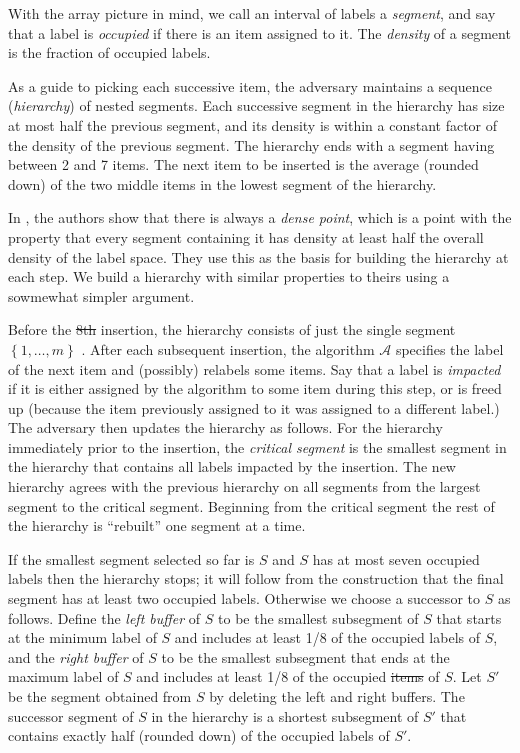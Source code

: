 \documentclass[unicode,review]{siamart1116}
\newcommand{\A}{\mathcal{A}}
\newcommand{\natInt}[2]{ \left\{ #1, \dotsc, #2 \right\} }
\numberwithin{theorem}{section}
\providecommand{\DIFadd}[1]{{\protect\color{blue}\uwave{#1}}} %
\providecommand{\DIFdel}[1]{{\protect\color{red}\sout{#1}}}                      %
\providecommand{\DIFaddbegin}{} %
\providecommand{\DIFaddend}{} %
\providecommand{\DIFdelbegin}{} %
\providecommand{\DIFdelend}{} %
\newcommand{\DIFscaledelfig}{0.5}
\newlength{\DIFdelgraphicswidth} %
\newlength{\DIFdelgraphicsheight} %
\newcommand{\DIFaddincludegraphics}[2][]{{\color{blue}\fbox{\DIFOincludegraphics[#1]{#2}}}} %
\newcommand{\DIFdelincludegraphics}[2][]{%
\sbox{\DIFdelgraphicsbox}{\DIFOincludegraphics[#1]{#2}}%
\settoboxwidth{\DIFdelgraphicswidth}{\DIFdelgraphicsbox} %
\settoboxtotalheight{\DIFdelgraphicsheight}{\DIFdelgraphicsbox} %
\scalebox{\DIFscaledelfig}{%
\parbox[b]{\DIFdelgraphicswidth}{\usebox{\DIFdelgraphicsbox}\\[-\baselineskip] \rule{\DIFdelgraphicswidth}{0em}}\llap{\resizebox{\DIFdelgraphicswidth}{\DIFdelgraphicsheight}{%
\setlength{\unitlength}{\DIFdelgraphicswidth}%
\begin{picture}(1,1)%
\thicklines\linethickness{2pt} %
{\color[rgb]{1,0,0}\put(0,0){\framebox(1,1){}}}%
{\color[rgb]{1,0,0}\put(0,0){\line( 1,1){1}}}%
{\color[rgb]{1,0,0}\put(0,1){\line(1,-1){1}}}%
\end{picture}%
}\hspace*{3pt}}} %
} %
\DeclareRobustCommand{\DIFaddbegin}{\DIFOaddbegin \let\includegraphics\DIFaddincludegraphics} %
\DeclareRobustCommand{\DIFaddend}{\DIFOaddend \let\includegraphics\DIFOincludegraphics} %
\DeclareRobustCommand{\DIFdelbegin}{\DIFOdelbegin \let\includegraphics\DIFdelincludegraphics} %
\DeclareRobustCommand{\DIFdelend}{\DIFOaddend \let\includegraphics\DIFOincludegraphics} %
\begin{document}
With the array picture in mind,
we  call an interval of labels a \emph{segment}, and say that a label is {\em occupied} if there is an item assigned to it.
The \emph{density} of a segment is the fraction of occupied labels.

As a guide to picking each successive item, the adversary maintains a sequence (\emph{hierarchy}) of nested segments.  Each successive segment in the hierarchy
has size at most half the previous segment, and its density  is within a constant factor of the density of the previous segment.
The hierarchy ends with a segment having between 2 and 7 items.  The next item to be inserted is the average (rounded down)
of the two middle items in the lowest segment of the hierarchy.

In \cite{DSZ04}, the authors show that there is always a \emph{dense point}, which is
a point  with the property that every segment containing it
has density at least half the overall density of the label space.  They use this as the basis for building the hierarchy at each
step.
We build a hierarchy with similar properties to theirs using a sowmewhat simpler argument.


Before the \DIFdelbegin \DIFdel{8th }\DIFdelend \DIFaddbegin \DIFadd{8-th }\DIFaddend insertion, the hierarchy consists of just the single segment $\natInt{1}{m}$ \DIFaddbegin \DIFadd{consisting of the equally spaced 7 items}\DIFaddend .
After each subsequent insertion,
the algorithm $\A$ specifies the label of the next item and (possibly) relabels some items. Say that a label is {\em impacted} if
it is either assigned by the algorithm to some item during this step, or is freed up (because the item previously
assigned to it was  assigned to a different label.) The adversary then updates the hierarchy as follows.  For the hierarchy immediately prior to the insertion, the {\em critical segment} is the smallest segment in the hierarchy that contains all 
labels impacted by the insertion.
The new hierarchy agrees with the previous hierarchy on all segments from the largest segment to 
the critical segment.   Beginning from the critical segment the rest of the hierarchy is ``rebuilt'' one segment at a time.

If the smallest segment selected so far is $S$ and $S$ has at most seven occupied labels then
the hierarchy stops; it will follow from the construction that the final segment has at least
two occupied labels.  Otherwise we choose a successor to $S$ as follows.
Define the
{\em left buffer} of $S$
to be the smallest subsegment of $S$ that starts at the minimum label of $S$ and
includes at least 1/8 of the occupied labels of $S$, and the {\em right buffer} of $S$ to be the smallest subsegment that ends at the maximum label of $S$
and includes at least 1/8 of the occupied \DIFdelbegin \DIFdel{items }\DIFdelend \DIFaddbegin \DIFadd{labels }\DIFaddend of $S$.
Let $S'$ be the segment obtained from $S$ by
deleting the left and right buffers. The successor segment of $S$ in the hierarchy is
a shortest subsegment of $S'$ that contains exactly half (rounded down) of the occupied labels of $S'$.
\end{document}
